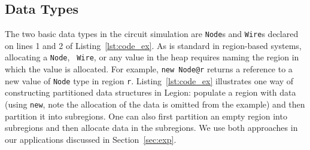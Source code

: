   





\subsection{Data Types}
\label{subsec:datatypes}
The two basic data types in the circuit simulation are {\tt Node}s and
{\tt Wire}s declared on lines 1 and 2 of Listing~\ref{lst:code_ex}.
As is standard in region-based systems, allocating a {\tt Node}, {\tt
  Wire}, or any value in the heap requires naming the region
in which the value is allocated.  For example, {\tt new Node@r} returns
a reference to a new value of {\tt Node} type in region {\tt r}.  
Listing~\ref{lst:code_ex} illustrates one way of constructing partitioned
data structures in Legion: populate a region with data (using {\tt new}, note the allocation
of the data is omitted from the example) and then partition it
into subregions.  One can also first partition an empty region into subregions
and then allocate data in the subregions. We use both approaches in our
applications discussed in Section~\ref{sec:exp}.

